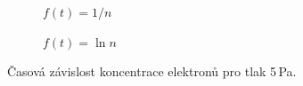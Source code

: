 \documentclass[a4paper,12pt]{article}
\begin{document}
\begin{figure}[h]
	\centering
	\begin{subfigure}[b]{.49\linewidth}
		\centering
		\caption{$f(t) = 1/n$}
	\end{subfigure}
	\begin{subfigure}[b]{.49\linewidth}
		\centering
		\caption{$f(t) = \ln n$}
	\end{subfigure}
	\caption{Časová závislost koncentrace elektronů pro tlak 5\,Pa.}
	\label{g:5Pa}
\end{figure}
\end{document}
